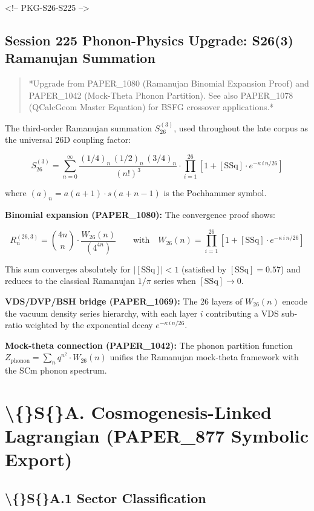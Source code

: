 \documentclass[11pt]{article}
\begin{document}
<!-- PKG-S26-S225 -->

\subsection*{Session 225 Phonon-Physics Upgrade: S26(3) Ramanujan Summation}

\begin{quote}
*Upgrade from PAPER\_1080 (Ramanujan Binomial Expansion Proof) and
PAPER\_1042 (Mock-Theta Phonon Partition).  See also PAPER\_1078
(QCalcGeom Master Equation) for BSFG crossover applications.*
\end{quote}

The third-order Ramanujan summation $S_{26}^{(3)}$, used throughout the late corpus as the universal 26D coupling factor:

$$S_{26}^{(3)} = \sum_{n=0}^{\infty} \frac{(1/4)_n\,(1/2)_n\,(3/4)_n}{(n!)^3} \cdot \prod_{i=1}^{26}\left[1 + [\text{SSq}]\cdot e^{-\kappa\,i\,n/26}\right]$$

where $(a)_n = a(a+1)\cdot s(a+n-1)$ is the Pochhammer symbol.

\textbf{Binomial expansion (PAPER\_1080):} The convergence proof shows:

$$R_n^{(26,3)} = \binom{4n}{n} \cdot \frac{W_{26}(n)}{(4^{4n})} \qquad \text{with}\quad W_{26}(n) = \prod_{i=1}^{26}\left[1 + [\text{SSq}]\cdot e^{-\kappa\,i\,n/26}\right]$$

This sum converges absolutely for $|[\text{SSq}]| < 1$ (satisfied by $[\text{SSq}] = 0.57$) and reduces to the classical Ramanujan $1/\pi$ series when $[\text{SSq}] \to 0$.

\textbf{VDS/DVP/BSH bridge (PAPER\_1069):} The 26 layers of $W_{26}(n)$ encode the vacuum density series hierarchy, with each layer $i$ contributing a VDS sub-ratio weighted by the exponential decay $e^{-\kappa\,i\,n/26}$.

\textbf{Mock-theta connection (PAPER\_1042):} The phonon partition function $Z_{\text{phonon}} = \sum_n q^{n^2} \cdot W_{26}(n)$ unifies the Ramanujan mock-theta framework with the SCm phonon spectrum.

\section*{\textbackslash\{\}S\{\}A. Cosmogenesis-Linked Lagrangian (PAPER\_877 Symbolic Export)}

\subsection*{\textbackslash\{\}S\{\}A.1 Sector Classification}
\end{document}
